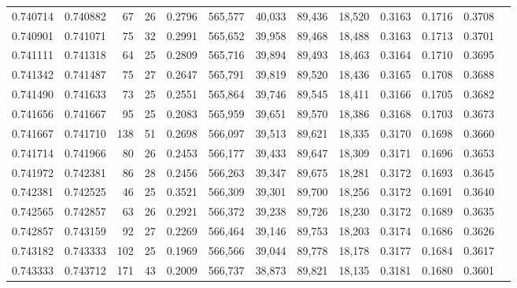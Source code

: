 \begin{tabular}{rrrrrrrrrrrrr}
0.740714 & 0.740882 &     67 &    26 &                                     0.2796 & 565,577 &  40,033 &  89,436 &  18,520 & 0.3163 & 0.1716 & 0.3708 \\
0.740901 & 0.741071 &     75 &    32 &                                     0.2991 & 565,652 &  39,958 &  89,468 &  18,488 & 0.3163 & 0.1713 & 0.3701 \\
0.741111 & 0.741318 &     64 &    25 &                                     0.2809 & 565,716 &  39,894 &  89,493 &  18,463 & 0.3164 & 0.1710 & 0.3695 \\
0.741342 & 0.741487 &     75 &    27 &                                     0.2647 & 565,791 &  39,819 &  89,520 &  18,436 & 0.3165 & 0.1708 & 0.3688 \\
0.741490 & 0.741633 &     73 &    25 &                                     0.2551 & 565,864 &  39,746 &  89,545 &  18,411 & 0.3166 & 0.1705 & 0.3682 \\
0.741656 & 0.741667 &     95 &    25 &                                     0.2083 & 565,959 &  39,651 &  89,570 &  18,386 & 0.3168 & 0.1703 & 0.3673 \\
0.741667 & 0.741710 &    138 &    51 &                                     0.2698 & 566,097 &  39,513 &  89,621 &  18,335 & 0.3170 & 0.1698 & 0.3660 \\
0.741714 & 0.741966 &     80 &    26 &                                     0.2453 & 566,177 &  39,433 &  89,647 &  18,309 & 0.3171 & 0.1696 & 0.3653 \\
0.741972 & 0.742381 &     86 &    28 &                                     0.2456 & 566,263 &  39,347 &  89,675 &  18,281 & 0.3172 & 0.1693 & 0.3645 \\
0.742381 & 0.742525 &     46 &    25 &                                     0.3521 & 566,309 &  39,301 &  89,700 &  18,256 & 0.3172 & 0.1691 & 0.3640 \\
0.742565 & 0.742857 &     63 &    26 &                                     0.2921 & 566,372 &  39,238 &  89,726 &  18,230 & 0.3172 & 0.1689 & 0.3635 \\
0.742857 & 0.743159 &     92 &    27 &                                     0.2269 & 566,464 &  39,146 &  89,753 &  18,203 & 0.3174 & 0.1686 & 0.3626 \\
0.743182 & 0.743333 &    102 &    25 &                                     0.1969 & 566,566 &  39,044 &  89,778 &  18,178 & 0.3177 & 0.1684 & 0.3617 \\
0.743333 & 0.743712 &    171 &    43 &                                     0.2009 & 566,737 &  38,873 &  89,821 &  18,135 & 0.3181 & 0.1680 & 0.3601 \\

\end{tabular}
